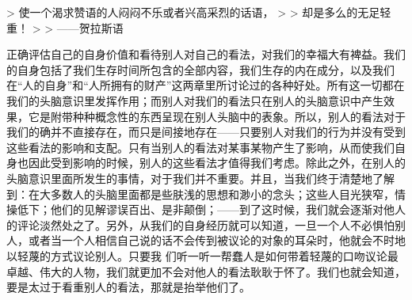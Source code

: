 \documentclass[12pt,oneside]{book}
\begin{document}
 

> 使一个渴求赞语的人闷闷不乐或者兴高采烈的话语， 
>
> 却是多么的无足轻重！ 
>
> ——贺拉斯语 

 

正确评估自己的自身价值和看待别人对自己的看法，对我们的幸福大有裨益。我们的自身包括了我们生存时间所包含的全部内容，我们生存的内在成分，以及我们在“人的自身”和“人所拥有的财产”这两章里所讨论过的各种好处。所有这一切都在我们的头脑意识里发挥作用；而别人对我们的看法只在别人的头脑意识中产生效果，它是附带种种概念性的东西呈现在别人头脑中的表象。所以，别人的看法对于我们的确并不直接存在，而只是间接地存在——只要别人对我们的行为并没有受到这些看法的影响和支配。只有当别人的看法对某事某物产生了影响，从而使我们自身也因此受到影响的时候，别人的这些看法才值得我们考虑。除此之外，在别人的头脑意识里面所发生的事情，对于我们并不重要。并且，当我们终于清楚地了解到：在大多数人的头脑里面都是些肤浅的思想和渺小的念头；这些人目光狭窄，情操低下；他们的见解谬误百出、是非颠倒；——到了这时候，我们就会逐渐对他人的评论淡然处之了。另外，从我们的自身经历就可以知道，一旦一个人不必惧怕别人，或者当一个人相信自己说的话不会传到被议论的对象的耳朵时，他就会不时地以轻蔑的方式议论别人。只要我
们听一听一帮蠢人是如何带着轻蔑的口吻议论最卓越、伟大的人物，我们就更加不会对他人的看法耿耿于怀了。我们也就会知道，要是太过于看重别人的看法，那就是抬举他们了。 
\end{document}
